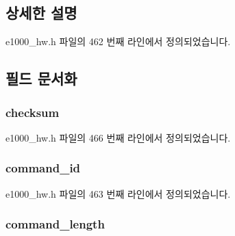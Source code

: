 \subsection{상세한 설명}


e1000\+\_\+hw.\+h 파일의 462 번째 라인에서 정의되었습니다.



\subsection{필드 문서화}
\subsubsection[{\texorpdfstring{checksum}{checksum}}]{ checksum}\hypertarget{structe1000__host__command__header_afd93107fee98407f162be1294fb053fd}{}\label{structe1000__host__command__header_afd93107fee98407f162be1294fb053fd}


e1000\+\_\+hw.\+h 파일의 466 번째 라인에서 정의되었습니다.

\subsubsection[{\texorpdfstring{command\+\_\+id}{command_id}}]{ command\+\_\+id}\hypertarget{structe1000__host__command__header_aa5d253518ff72b4ed6148c872420aa46}{}\label{structe1000__host__command__header_aa5d253518ff72b4ed6148c872420aa46}


e1000\+\_\+hw.\+h 파일의 463 번째 라인에서 정의되었습니다.

\subsubsection[{\texorpdfstring{command\+\_\+length}{command_length}}]{ command\+\_\+length}\hypertarget{structe1000__host__command__header_a4e35eba0d058e74d505908ac29e5e8bf}{}\label{structe1000__host__command__header_a4e35eba0d058e74d505908ac29e5e8bf}



